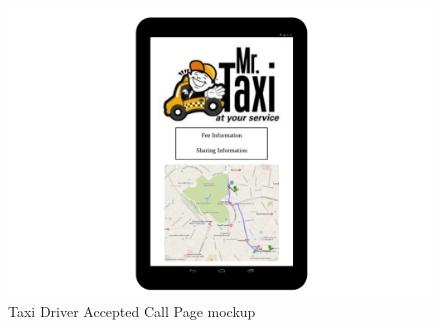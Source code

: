 \begin{figure}[htbp]
\centering
\includegraphics[width=\textwidth]{cpt/img/AccPage}
\caption{Taxi Driver Accepted Call Page mockup}
\label{fig:accpage}
\end{figure}
